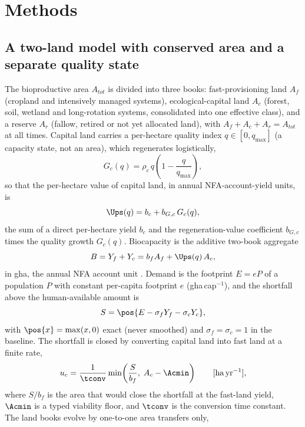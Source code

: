 \section{Methods}\label{sec:model}

\subsection{A two-land model with conserved area and a separate quality state}\label{sec:equations}

The bioproductive area $A_{tot}$ is divided into three books: fast-provisioning land $A_f$ (cropland and intensively managed systems), ecological-capital land $A_c$ (forest, soil, wetland and long-rotation systems, consolidated into one effective class), and a reserve $A_r$ (fallow, retired or not yet allocated land), with $A_f+A_c+A_r=A_{tot}$ at all times. Capital land carries a per-hectare quality index $q\in[0,q_{\max}]$ (a capacity state, not an area), which regenerates logistically,
\begin{equation}\label{eq:Gc}
G_c(q)=\rho_c\,q\left(1-\frac{q}{q_{\max}}\right),
\end{equation}
so that the per-hectare value of capital land, in annual NFA-account-yield units, is
\begin{equation}\label{eq:Ups}
\Ups(q)=b_c+b_{G,c}\,G_c(q),
\end{equation}
the sum of a direct per-hectare yield $b_c$ and the regeneration-value coefficient $b_{G,c}$ times the quality growth $G_c(q)$. Biocapacity is the additive two-book aggregate
\begin{equation}\label{eq:B}
B=Y_f+Y_c=b_f A_f+\Ups(q)\,A_c ,
\end{equation}
in gha, the annual NFA account unit \citep{GFNStandards2009,GFNGuidebook2019}. Demand is the footprint $E=eP$ of a population $P$ with constant per-capita footprint $e$ (gha\,cap$^{-1}$), and the shortfall above the human-available amount is
\begin{equation}\label{eq:S}
S=\pos{E-\sigma_f Y_f-\sigma_c Y_c},
\end{equation}
with $\pos{x}=\max(x,0)$ exact (never smoothed) and $\sigma_f=\sigma_c=1$ in the baseline. The shortfall is closed by converting capital land into fast land at a finite rate,
\begin{equation}\label{eq:uc}
u_c=\frac{1}{\tconv}\min\!\left(\frac{S}{b_f},\;A_c-\Acmin\right)\qquad[\mathrm{ha\,yr^{-1}}],
\end{equation}
where $S/b_f$ is the area that would close the shortfall at the fast-land yield, $\Acmin$ is a typed viability floor, and $\tconv$ is the conversion time constant. The land books evolve by one-to-one area transfers only,
